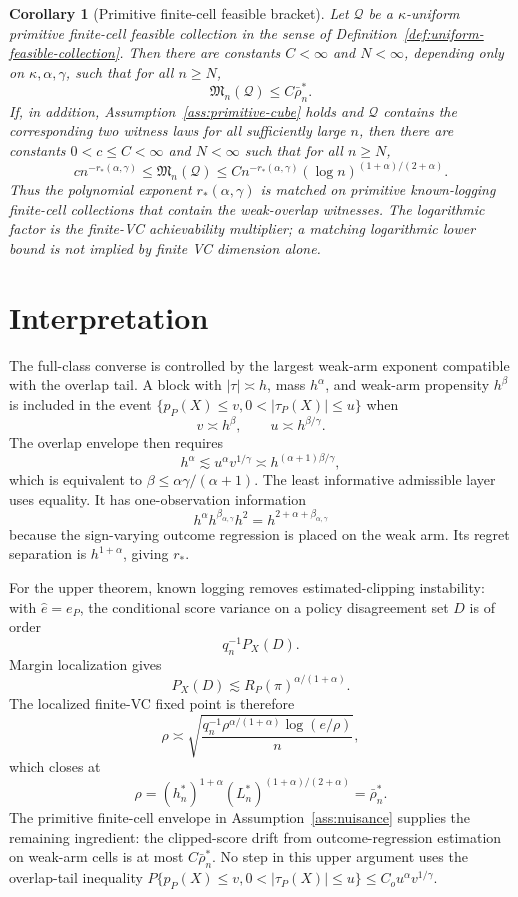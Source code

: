 \documentclass[11pt]{article}
\theoremstyle{definition}
\theoremstyle{plain}
\newtheorem{corollary}{Corollary}
\theoremstyle{remark}
\begin{document}
\begin{corollary}[Primitive finite-cell feasible bracket]\label{cor:feasible-bracket}
Let \(\mathcal Q\) be a \(\kappa\)-uniform primitive finite-cell feasible
collection in the sense of Definition~\ref{def:uniform-feasible-collection}.
Then there are constants \(C<\infty\) and \(N<\infty\), depending only on
\(\kappa,\alpha,\gamma\), such that for all \(n\ge N\),
\[
\mathfrak M_n(\mathcal Q)
\le
C\bar\rho_n^*.
\]
If, in addition, Assumption~\ref{ass:primitive-cube} holds and \(\mathcal Q\)
contains the corresponding two witness laws for all sufficiently large \(n\),
then there are constants \(0<c\le C<\infty\) and \(N<\infty\) such that for all
\(n\ge N\),
\[
c n^{-r_*(\alpha,\gamma)}
\le
\mathfrak M_n(\mathcal Q)
\le
C n^{-r_*(\alpha,\gamma)}
(\log n)^{(1+\alpha)/(2+\alpha)}.
\]
Thus the polynomial exponent \(r_*(\alpha,\gamma)\) is matched on primitive
known-logging finite-cell collections that contain the weak-overlap witnesses.
The logarithmic factor is the finite-VC achievability multiplier; a matching
logarithmic lower bound is not implied by finite VC dimension alone.
\end{corollary}

\section{Interpretation}
The full-class converse is controlled by the largest weak-arm exponent
compatible with the overlap tail.  A block with \(|\tau|\asymp h\), mass
\(h^\alpha\), and weak-arm propensity \(h^\beta\) is included in the event
\(\{p_P(X)\le v,0<|\tau_P(X)|\le u\}\) when
\[
v\asymp h^\beta,\qquad u\asymp h^{\beta/\gamma}.
\]
The overlap envelope then requires
\[
h^\alpha\lesssim u^\alpha v^{1/\gamma}
\asymp h^{(\alpha+1)\beta/\gamma},
\]
which is equivalent to
\(\beta\le\alpha\gamma/(\alpha+1)\).  The least informative admissible layer
uses equality.  It has one-observation information
\[
h^\alpha h^{\beta_{\alpha,\gamma}}h^2
=h^{2+\alpha+\beta_{\alpha,\gamma}}
\]
because the sign-varying outcome regression is placed on the weak arm.  Its
regret separation is \(h^{1+\alpha}\), giving \(r_*\).

For the upper theorem, known logging removes estimated-clipping instability:
with \(\widehat e=e_P\), the conditional score variance on a policy
disagreement set \(D\) is of order
\[
q_n^{-1}P_X(D).
\]
Margin localization gives
\[
P_X(D)\lesssim R_P(\pi)^{\alpha/(1+\alpha)}.
\]
The localized finite-VC fixed point is therefore
\[
\rho
\asymp
\sqrt{\frac{q_n^{-1}\rho^{\alpha/(1+\alpha)}
\log(e/\rho)}{n}},
\]
which closes at
\[
\rho=(h_n^*)^{1+\alpha}(L_n^*)^{(1+\alpha)/(2+\alpha)}
=\bar\rho_n^*.
\]
The primitive finite-cell envelope in Assumption~\ref{ass:nuisance} supplies
the remaining ingredient: the clipped-score drift from outcome-regression
estimation on weak-arm cells is at most \(C\bar\rho_n^*\).  No step in this
upper argument uses the overlap-tail inequality
\(P\{p_P(X)\le v,0<|\tau_P(X)|\le u\}\le C_o u^\alpha v^{1/\gamma}\).
\end{document}
